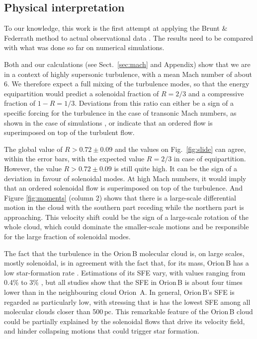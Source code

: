 \documentclass[structabstract]{aa}
\newcommand{\emm}[1]{\ensuremath{#1}}
\newcommand{\emr}[1]{\emm{\mathrm{#1}}}
\newcommand{\unit}[1]{\emr{\,#1}}
\newcommand{\pc}{\unit{pc}}
\begin{document}
\subsection{Physical interpretation}
To our knowledge, this work is the first attempt at applying the Brunt \& Federrath method to actual observational data \citep{brunt14, lomax15}. The results need to be compared with what was done so far on numerical simulations.

Both \citet{schneider13} and our calculations (see Sect.~\ref{sec:mach} and Appendix) show that we are in a context of highly supersonic turbulence, with a mean Mach number of about 6. We therefore expect a full mixing of the turbulence modes, so that the energy equipartition would predict a solenoidal fraction of $R = 2/3$ and a compressive fraction of $1 - R = 1/3$. Deviations from this ratio can either be a sign of a specific forcing for the turbulence in the case of transonic Mach numbers, as shown in the case of simulations \citep{brunt14}, or indicate that an ordered flow is superimposed on top of the turbulent flow.

The global value of $R > 0.72 \pm 0.09$ and the values on Fig.~\ref{fig:slide} can agree, within the error bars, with the expected value $R = 2/3$ in case of equipartition. However, the value $R > 0.72 \pm 0.09$ is still quite high. It can be the sign of a deviation in favour of solenoidal modes. At high Mach numbers, it would imply that an ordered solenoidal flow is superimposed on top of the turbulence. And Figure \ref{fig:moments} (column 2) shows that there is a large-scale differential motion in the cloud with the southern part receding while the northern part is approaching. This velocity shift could be the sign of a large-scale rotation of the whole cloud, which could dominate the smaller-scale motions and be responsible for the large fraction of solenoidal modes.

The fact that the turbulence in the Orion\,B molecular cloud is, on large scales, mostly solenoidal, is in agreement with the fact that, for its mass, Orion\,B has a low star-formation rate \citep{lada10}. Estimations of its SFE vary, with values ranging from 0.4\% to 3\% \citep{lada92, carpenter00, federrath13, megeath16}, but all studies show that the SFE in Orion\,B is about four times lower than in the neighbouring cloud Orion~A. In general, Orion\,B's SFE is regarded as particularly low, with \citet{megeath16} stressing that is has the lowest SFE among all molecular clouds closer than 500\pc. This remarkable feature of the Orion\,B cloud could be partially explained by the solenoidal flows that drive its velocity field, and hinder collapsing motions that could trigger star formation.
\\
\end{document}
